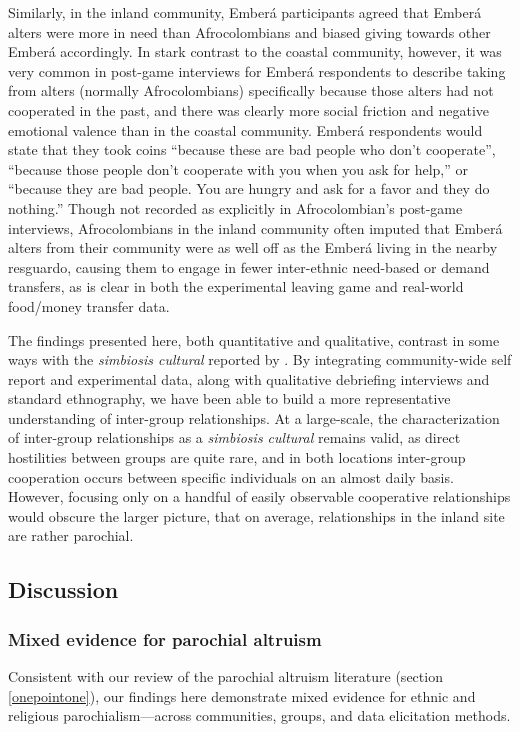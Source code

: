 \documentclass[bibauthoryear]{aa}
\begin{document}
Similarly, in the inland community, Ember\'a participants agreed that Ember\'a alters were more in need than Afrocolombians and biased giving towards other Ember\'a accordingly. In stark contrast to the coastal community, however, it was very common in post-game interviews for Ember\'a respondents to describe taking from alters (normally Afrocolombians) specifically because those alters had not cooperated in the past, and there was clearly more social friction and negative emotional valence than in the coastal community. Ember\'a respondents would state that they took coins ``because these  are bad people  who don't cooperate'', ``because those people don't cooperate with you when you ask for help,'' or ``because they are bad people. You are hungry and ask for a favor and they do nothing.'' Though not recorded as explicitly in Afrocolombian's post-game interviews,  Afrocolombians in the inland community often imputed that Ember\'a alters from their community were as well off as the Ember\'a living in the nearby resguardo, causing them to engage in fewer inter-ethnic need-based or demand transfers, as is clear in both the experimental leaving game and real-world food/money transfer data.

The findings presented here, both quantitative and qualitative, contrast in some ways with the \textit{simbiosis cultural} reported by \citet{Cay73}. By integrating community-wide self report and experimental data, along with qualitative debriefing interviews and standard ethnography, we have been able to build a more representative understanding of inter-group relationships. At a large-scale, the characterization of inter-group relationships as a \textit{simbiosis cultural} remains valid, as direct hostilities between groups are quite rare, and in both locations inter-group cooperation occurs between specific individuals on an almost daily basis. However, focusing only on a handful of easily observable cooperative relationships would obscure the larger picture, that on average, relationships in the inland site are rather parochial.
  

\subsection{Discussion}
\subsubsection{Mixed evidence for parochial altruism}

Consistent with our review of the parochial altruism literature (section \ref{onepointone}), our findings here demonstrate mixed evidence for ethnic and religious parochialism---across communities, groups, and data elicitation methods.
\end{document}
